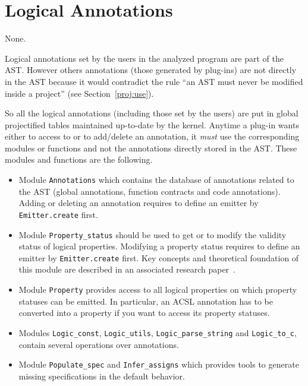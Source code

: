 
\section{Logical Annotations}\label{adv:annotations}

\begin{prereq}
  None.
\end{prereq}

Logical annotations set by the users in the analyzed \C program are part of the
AST. However others annotations (those generated by plug-ins) are
not directly in the AST because it would contradict the rule ``an AST must
never be modified inside a project'' (see Section~\ref{proj:use}).

So all the logical annotations (including those set by the users) are put in
global projectified tables maintained up-to-date by the \framac kernel. Anytime
a plug-in wants either to access to or to add/delete an annotation, it
\emph{must} use the corresponding modules or functions and not the annotations
directly stored in the AST. These modules and functions are the following.
\begin{itemize}
\item Module \texttt{Annotations} which contains the
  database of annotations related to the AST (global annotations, function
  contracts and code annotations). Adding or deleting an annotation requires to
  define an emitter by \texttt{Emitter.create} first.
\item Module \texttt{Property\_status} should
  be used to get or to modify the validity status of logical
  properties. Modifying a property status requires to define an emitter by
  \texttt{Emitter.create} first. Key concepts and
  theoretical foundation of this module are described in an associated research
  paper~\cite{fmics12}.
\item Module \texttt{Property} provides access to all
  logical properties on which property statuses can be emitted. In particular,
  an ACSL annotation has to be converted into a property if you want to access
  its property statuses.
\item Modules \texttt{Logic\_const},
  \texttt{Logic\_utils},
  \texttt{Logic\_parse\_string} and
  \texttt{Logic\_to\_c}, contain several
  operations over annotations.
\item Module \texttt{Populate\_spec} and
  \texttt{Infer\_assigns} which provides
  tools to generate missing specifications in the default behavior.

\end{itemize}

